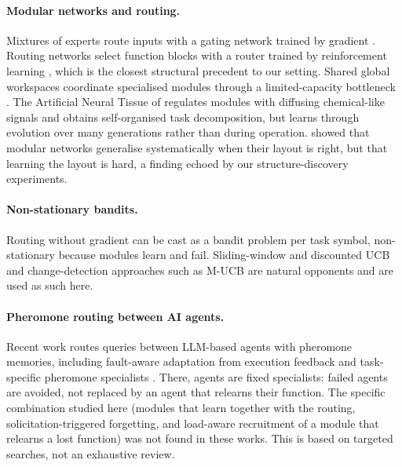 \documentclass[11pt,a4paper]{article}
\begin{document}
\paragraph{Modular networks and routing.} Mixtures of experts route inputs with a gating network trained by gradient \citep{jacobs1991experts,shazeer2017moe}. Routing networks select function blocks with a router trained by reinforcement learning \citep{rosenbaum2018routing}, which is the closest structural precedent to our setting. Shared global workspaces coordinate specialised modules through a limited-capacity bottleneck \citep{goyal2022workspace}. The Artificial Neural Tissue of \citet{thangavelautham2012ant} regulates modules with diffusing chemical-like signals and obtains self-organised task decomposition, but learns through evolution over many generations rather than during operation. \citet{bahdanau2019systematic} showed that modular networks generalise systematically when their layout is right, but that learning the layout is hard, a finding echoed by our structure-discovery experiments.

\paragraph{Non-stationary bandits.} Routing without gradient can be cast as a bandit problem per task symbol, non-stationary because modules learn and fail. Sliding-window and discounted UCB \citep{garivier2011switching} and change-detection approaches such as M-UCB \citep{cao2019mucb} are natural opponents and are used as such here.

\paragraph{Pheromone routing between AI agents.} Recent work routes queries between LLM-based agents with pheromone memories, including fault-aware adaptation from execution feedback \citep{du2026stigmergyrouter} and task-specific pheromone specialists \citep{wang2026amros}. There, agents are fixed specialists: failed agents are avoided, not replaced by an agent that relearns their function. The specific combination studied here (modules that learn together with the routing, solicitation-triggered forgetting, and load-aware recruitment of a module that relearns a lost function) was not found in these works. This is based on targeted searches, not an exhaustive review.
\end{document}
